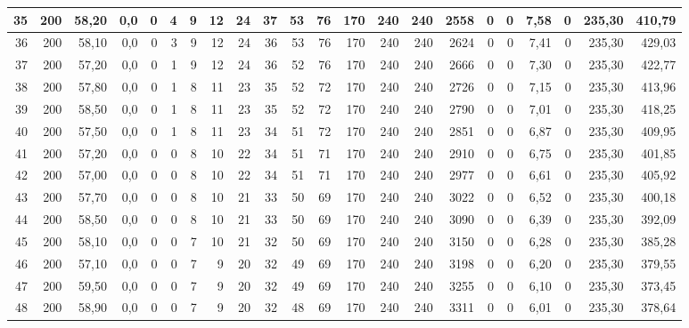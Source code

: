 \begin{appendices}
\begin{table}[H]
{\begin{tabular}{rrrrrrrrrrrrrrrrrrrrrr}
      35 & 200 & 58{,}20 & 0{,}0 & 0  & 4  & 9  & 12 & 24 & 37 & 53  & 76  & 170 & 240 & 240 & 2558 & 0 & 0  & 7{,}58  & 0 & 235{,}30 & 410{,}79 \\ \hline
      36 & 200 & 58{,}10 & 0{,}0 & 0  & 3  & 9  & 12 & 24 & 36 & 53  & 76  & 170 & 240 & 240 & 2624 & 0 & 0  & 7{,}41  & 0 & 235{,}30 & 429{,}03 \\ \hline
      37 & 200 & 57{,}20 & 0{,}0 & 0  & 1  & 9  & 12 & 24 & 36 & 52  & 76  & 170 & 240 & 240 & 2666 & 0 & 0  & 7{,}30  & 0 & 235{,}30 & 422{,}77 \\ \hline
      38 & 200 & 57{,}80 & 0{,}0 & 0  & 1  & 8  & 11 & 23 & 35 & 52  & 72  & 170 & 240 & 240 & 2726 & 0 & 0  & 7{,}15  & 0 & 235{,}30 & 413{,}96 \\ \hline
      39 & 200 & 58{,}50 & 0{,}0 & 0  & 1  & 8  & 11 & 23 & 35 & 52  & 72  & 170 & 240 & 240 & 2790 & 0 & 0  & 7{,}01  & 0 & 235{,}30 & 418{,}25 \\ \hline
      40 & 200 & 57{,}50 & 0{,}0 & 0  & 1  & 8  & 11 & 23 & 34 & 51  & 72  & 170 & 240 & 240 & 2851 & 0 & 0  & 6{,}87  & 0 & 235{,}30 & 409{,}95 \\ \hline
      41 & 200 & 57{,}20 & 0{,}0 & 0  & 0  & 8  & 10 & 22 & 34 & 51  & 71  & 170 & 240 & 240 & 2910 & 0 & 0  & 6{,}75  & 0 & 235{,}30 & 401{,}85 \\ \hline
      42 & 200 & 57{,}00 & 0{,}0 & 0  & 0  & 8  & 10 & 22 & 34 & 51  & 71  & 170 & 240 & 240 & 2977 & 0 & 0  & 6{,}61  & 0 & 235{,}30 & 405{,}92 \\ \hline
      43 & 200 & 57{,}70 & 0{,}0 & 0  & 0  & 8  & 10 & 21 & 33 & 50  & 69  & 170 & 240 & 240 & 3022 & 0 & 0  & 6{,}52  & 0 & 235{,}30 & 400{,}18 \\ \hline
      44 & 200 & 58{,}50 & 0{,}0 & 0  & 0  & 8  & 10 & 21 & 33 & 50  & 69  & 170 & 240 & 240 & 3090 & 0 & 0  & 6{,}39  & 0 & 235{,}30 & 392{,}09 \\ \hline
      45 & 200 & 58{,}10 & 0{,}0 & 0  & 0  & 7  & 10 & 21 & 32 & 50  & 69  & 170 & 240 & 240 & 3150 & 0 & 0  & 6{,}28  & 0 & 235{,}30 & 385{,}28 \\ \hline
      46 & 200 & 57{,}10 & 0{,}0 & 0  & 0  & 7  & 9  & 20 & 32 & 49  & 69  & 170 & 240 & 240 & 3198 & 0 & 0  & 6{,}20  & 0 & 235{,}30 & 379{,}55 \\ \hline
      47 & 200 & 59{,}50 & 0{,}0 & 0  & 0  & 7  & 9  & 20 & 32 & 49  & 69  & 170 & 240 & 240 & 3255 & 0 & 0  & 6{,}10  & 0 & 235{,}30 & 373{,}45 \\ \hline
      48 & 200 & 58{,}90 & 0{,}0 & 0  & 0  & 7  & 9  & 20 & 32 & 48  & 69  & 170 & 240 & 240 & 3311 & 0 & 0  & 6{,}01  & 0 & 235{,}30 & 378{,}64 \\ \hline

\end{tabular}}
\end{table}
\end{appendices}
